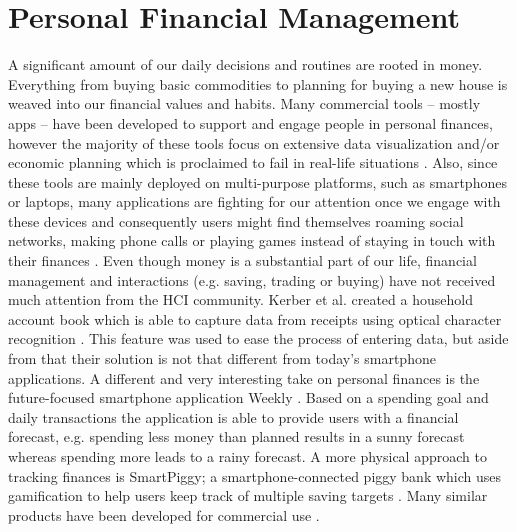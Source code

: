 \section{Personal Financial Management}
A significant amount of our daily decisions and routines are rooted in money. Everything from buying basic commodities to planning for buying a new house is weaved into our financial values and habits. Many commercial tools -- mostly apps \cite{mint,spiir,levelmoney,homebudget,moneylover} -- have been developed to support and engage people in personal finances, however the majority of these tools focus on extensive data visualization and/or economic planning which is proclaimed to fail in real-life situations \cite{snow2015fixing}. Also, since these tools are mainly deployed on multi-purpose platforms, such as smartphones or laptops, many applications are fighting for our attention once we engage with these devices and consequently users might find themselves roaming social networks, making phone calls or playing games instead of staying in touch with their finances \cite[p.~3894]{coleman2008nestegg}. Even though money is a substantial part of our life, financial management and interactions (e.g. saving, trading or buying) have not received much attention from the HCI community.
Kerber et al. created a household account book which is able to capture data from receipts using optical character recognition \cite{kerber2014towards}. This feature was used to ease the process of entering data, but aside from that their solution is not that different from today’s smartphone applications. A different and very interesting take on personal finances is the future-focused smartphone application Weekly \cite{weekly}. Based on a spending goal and daily transactions the application is able to provide users with a financial forecast, e.g. spending less money than planned results in a sunny forecast whereas spending more leads to a rainy forecast. A more physical approach to tracking finances is SmartPiggy; a smartphone-connected piggy bank which uses gamification to help users keep track of multiple saving targets \cite{stockinger2013smartpiggy}. Many similar products have been developed for commercial use \cite{ernit,kash,porkfolio}.\\
